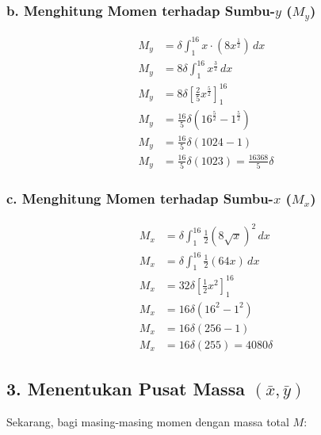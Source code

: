 \documentclass[12pt,a4paper]{article}
\begin{document}
\subsubsection*{b. Menghitung Momen terhadap Sumbu-$y$ ($M_y$)}
\begin{align*}
  M_y &= \delta \int_{1}^{16} x \cdot \left(8x^{\frac{1}{2}}\right) \, dx \\
  M_y &= 8\delta \int_{1}^{16} x^{\frac{3}{2}} \, dx \\
  M_y &= 8\delta \left[ \frac{2}{5}x^{\frac{5}{2}} \right]_{1}^{16} \\
  M_y &= \frac{16}{5}\delta \left( 16^{\frac{5}{2}} - 1^{\frac{5}{2}} \right) \\
  M_y &= \frac{16}{5}\delta \left( 1024 - 1 \right) \\
  M_y &= \frac{16}{5}\delta (1023) = \frac{16368}{5}\delta
\end{align*}

\subsubsection*{c. Menghitung Momen terhadap Sumbu-$x$ ($M_x$)}
\begin{align*}
  M_x &= \delta \int_{1}^{16} \frac{1}{2} \left(8\sqrt{x}\right)^2 \, dx \\
  M_x &= \delta \int_{1}^{16} \frac{1}{2} (64x) \, dx \\
  M_x &= 32\delta \left[ \frac{1}{2}x^2 \right]_{1}^{16} \\
  M_x &= 16\delta \left( 16^2 - 1^2 \right) \\
  M_x &= 16\delta (256 - 1) \\
  M_x &= 16\delta (255) = 4080\delta
\end{align*}

\subsection*{3. Menentukan Pusat Massa $(\bar{x}, \bar{y})$}
Sekarang, bagi masing-masing momen dengan massa total $M$:
\end{document}
